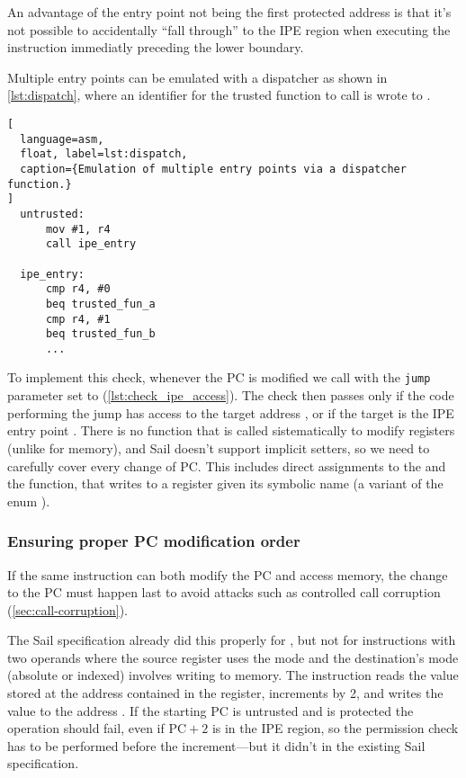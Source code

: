 An advantage of the entry point not being the first protected address is that it's not possible to accidentally ``fall through'' to the IPE region when executing the instruction immediatly preceding the lower boundary.

Multiple entry points can be emulated with a dispatcher as shown in \cref{lst:dispatch}, where an identifier for the trusted function to call is wrote to .

\begin{lstlisting}[
  language=asm,
  float, label=lst:dispatch,
  caption={Emulation of multiple entry points via a dispatcher function.}
]
  untrusted:
      mov #1, r4
      call ipe_entry

  ipe_entry:
      cmp r4, #0
      beq trusted_fun_a
      cmp r4, #1
      beq trusted_fun_b
      ...
\end{lstlisting}

To implement this check, whenever the PC is modified we call  with the \texttt{jump} parameter set to  (\cref{lst:check_ipe_access}). The check then passes only if the code performing the jump has access to the target address , or if the target is the IPE entry point . There is no function that is called sistematically to modify registers (unlike  for memory), and Sail doesn't support implicit setters, so we need to carefully cover every change of PC. This includes direct assignments to the   and the  function, that writes to a register given its symbolic name (a variant of the enum ).

\subsubsection{Ensuring proper PC modification order}

If the same instruction can both modify the PC and access memory, the change to the PC must happen last to avoid attacks such as controlled call corruption (\cref{sec:call-corruption}).

The Sail specification already did this properly for , but not for instructions with two operands where the source register uses the  mode and the destination's mode (absolute or indexed) involves writing to memory. The instruction  reads the value stored at the address contained in the  register, increments  by 2, and writes the value to the address . If the starting PC is untrusted and  is protected the operation should fail, even if \(\mathrm{PC} + 2\) is in the IPE region, so the permission check has to be performed before the increment---but it didn't in the existing Sail specification.

